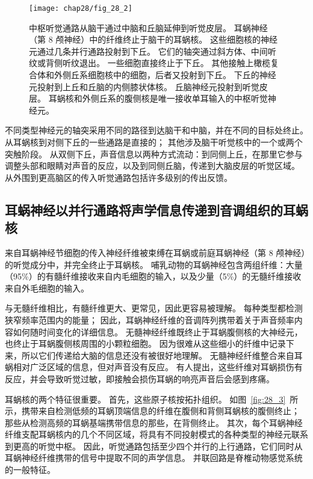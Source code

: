 \begin{figure}[htbp]
	\centering
	\texttt{[image: chap28/fig\_28\_2]}
	\caption{中枢听觉通路从脑干通过中脑和丘脑延伸到听觉皮层。
		耳蜗神经（第 8 颅神经）中的纤维终止于脑干的耳蜗核。
		这些细胞核的神经元通过几条并行通路投射到下丘。
		它们的轴突通过斜方体、中间听纹或背侧听纹退出。
		一些细胞直接终止于下丘。
		其他接触上橄榄复合体和外侧丘系细胞核中的细胞，后者又投射到下丘。
		下丘的神经元投射到上丘和丘脑的内侧膝状体核。
		丘脑神经元投射到听觉皮层。
		耳蜗核和外侧丘系的腹侧核是唯一接收单耳输入的中枢听觉神经元。}
	\label{fig:28_2}
\end{figure}


不同类型神经元的轴突采用不同的路径到达脑干和中脑，并在不同的目标处终止。
从耳蜗核到对侧下丘的一些通路是直接的；
其他涉及脑干听觉核中的一个或两个突触阶段。
从双侧下丘，声音信息以两种方式流动：到同侧上丘，在那里它参与调整头部和眼睛对声音的反应，以及到同侧丘脑，传递到大脑皮层的听觉区域。
从外围到更高脑区的传入听觉通路包括许多级别的传出反馈。



\subsection{耳蜗神经以并行通路将声学信息传递到音调组织的耳蜗核}

来自耳蜗神经节细胞的传入神经纤维被束缚在耳蜗或前庭耳蜗神经（第 8 颅神经）的听觉成分中，并完全终止于耳蜗核。
哺乳动物的耳蜗神经包含两组纤维：大量（95\%）的有髓纤维接收来自内毛细胞的输入，以及少量（5\%）的无髓纤维接收来自外毛细胞的输入。


与无髓纤维相比，有髓纤维更大、更常见，因此更容易被理解。
每种类型都检测狭窄频率范围内的能量；
因此，耳蜗神经纤维的音调阵列携带着关于声音频率内容如何随时间变化的详细信息。
无髓神经纤维既终止于耳蜗腹侧核的大神经元，也终止于耳蜗腹侧核周围的小颗粒细胞。
因为很难从这些细小的纤维中记录下来，所以它们传递给大脑的信息还没有被很好地理解。
无髓神经纤维整合来自耳蜗相对广泛区域的信息，但对声音没有反应。
有人提出，这些纤维对耳蜗损伤有反应，并会导致听觉过敏，即接触会损伤耳蜗的响亮声音后会感到疼痛。


耳蜗核的两个特征很重要。
首先，这些原子核按拓扑组织。
如图~\ref{fig:28_3}~所示，携带来自检测低频的耳蜗顶端信息的纤维在腹侧和背侧耳蜗核的腹侧终止； 
那些从检测高频的耳蜗基端携带信息的那些，在背侧终止。 
其次，每个耳蜗神经纤维支配耳蜗核内的几个不同区域，将具有不同投射模式的各种类型的神经元联系到更高的听觉中枢。
因此，听觉通路包括至少四个并行的上行通路，它们同时从耳蜗神经纤维携带的信号中提取不同的声学信息。
并联回路是脊椎动物感觉系统的一般特征。


